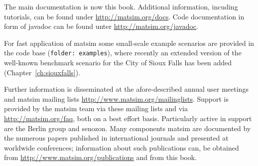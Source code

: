 The main documentation is now this book.  Additional information, incuding tutorials, can be found under \url{http://matsim.org/docs}.
%
%
Code documentation in form of \gls{javadoc} can be found unter \url{http://matsim.org/javadoc}.

For fast application of \gls{matsim} some small-scale example scenarios are provided in the code base (\lstinline|folder: examples|), where recently an extended version of the well-known benchmark scenario for the City of Sioux Falls has been added \citep[][]{ChakirovFourie_TechRep_FCL_2014} (Chapter~\ref{ch:siouxfalls}). %

Further information is disseminated at the afore-described annual user meetings and \gls{matsim} mailing lists \url{http://www.matsim.org/mailinglists}.  Support is provided by the \gls{matsim} team via these mailing lists and via \url{http://matsim.org/faq}, both on a best effort basis. Particularly active in support are the Berlin group and \gls{senozon}. Many components \gls{matsim} are documented by the numerous papers published in international journals and presented at worldwide conferences; information about such publications can, \eg be obtained from \url{http://www.matsim.org/publications} 
and from this book.

